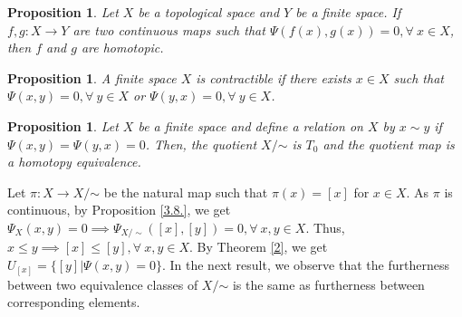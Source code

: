 \documentclass[12pt]{amsart}
\newtheorem{proposition}[definition]{Proposition}
\begin{document}

\begin{proposition}
	Let $X$ be a topological space and $Y$ be a finite space. If $f,g: X\longrightarrow Y$ are two continuous maps such that $\Psi(f(x),g(x))=0,\forall~ x\in X$, then $f$ and $g$ are homotopic.
\end{proposition}

\begin{proposition}
	A finite space $X$ is contractible if there exists $x\in X$ such that $\Psi(x,y)=0,\forall~ y\in X$ or $\Psi(y,x)=0,\forall ~ y\in X$.
\end{proposition}

\begin{proposition}\label{3..8}
	Let $X$ be a finite space and define a relation on $X$ by $x\sim y$ if $\Psi(x,y)=\Psi(y,x)=0$. Then, the quotient $X/$$\sim$ is $T_0$ and  the quotient map is a homotopy equivalence.
\end{proposition}


Let $\pi:X\longrightarrow X/$$\sim$ be the natural map such that $\pi(x)=[x]$ for $x\in X$. As $\pi$ is continuous, by Proposition \ref{3.8.}, we get $\Psi_X(x,y)=0\implies \Psi_{X/\sim}([x],[y])=0,\forall~ x,y\in X$. Thus, $x\leq y \implies [x]\leq [y],\forall~ x,y\in X$. By Theorem \ref{2}, we get $U_{[x]}=\{[y]|\Psi(x,y)=0\}.$
In the next result, we observe that the furtherness between two equivalence classes of $X/$$\sim$  is the same as furtherness between corresponding elements. 
\end{document}
